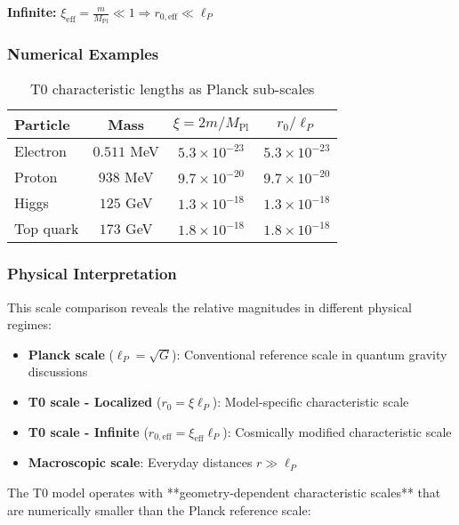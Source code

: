 \documentclass[12pt,a4paper]{article}
\begin{document}
\textbf{Infinite:} $\xi_{\text{eff}} = \frac{m}{M_{\text{Pl}}} \ll 1 \Rightarrow r_{0,\text{eff}} \ll \ell_P$

\subsubsection{Numerical Examples}
\label{subsubsec:numerical_examples}

\begin{table}[htbp]
	\centering
	\begin{tabular}{|l|c|c|c|}
		\hline
		\textbf{Particle} & \textbf{Mass} & \textbf{$\xi = 2m/M_{\text{Pl}}$} & \textbf{$r_0/\ell_P$} \\
		\hline
		Electron & $0.511$ MeV & $5.3 \times 10^{-23}$ & $5.3 \times 10^{-23}$ \\
		Proton & $938$ MeV & $9.7 \times 10^{-20}$ & $9.7 \times 10^{-20}$ \\
		Higgs & $125$ GeV & $1.3 \times 10^{-18}$ & $1.3 \times 10^{-18}$ \\
		Top quark & $173$ GeV & $1.8 \times 10^{-18}$ & $1.8 \times 10^{-18}$ \\
		\hline
	\end{tabular}
	\caption{T0 characteristic lengths as Planck sub-scales}
\end{table}

\subsubsection{Physical Interpretation}
\label{subsubsec:physical_interpretation}

This scale comparison reveals the relative magnitudes in different physical regimes:

\begin{itemize}
	\item \textbf{Planck scale} ($\ell_P = \sqrt{G}$): Conventional reference scale in quantum gravity discussions
	\item \textbf{T0 scale - Localized} ($r_0 = \xi \ell_P$): Model-specific characteristic scale 
	\item \textbf{T0 scale - Infinite} ($r_{0,\text{eff}} = \xi_{\text{eff}} \ell_P$): Cosmically modified characteristic scale
	\item \textbf{Macroscopic scale}: Everyday distances $r \gg \ell_P$
\end{itemize}

The T0 model operates with **geometry-dependent characteristic scales** that are numerically smaller than the Planck reference scale:
\end{document}
